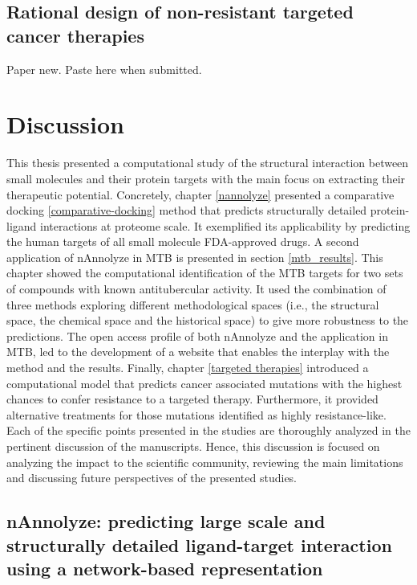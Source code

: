 \documentclass[11pt, b5paper,twoside]{tesi_upf}
\begin{document}
\clearpage
\subsection{Rational design of non-resistant targeted cancer therapies}\label{blending}

\par Paper new. Paste here when submitted. 



\clearpage
\section{Discussion}\label{discussion}

\par This thesis presented a computational study of the structural interaction between small molecules and their protein targets with the main focus on extracting their therapeutic potential. Concretely, chapter \ref{nannolyze} presented a comparative docking \ref{comparative-docking} method that predicts structurally detailed protein-ligand interactions at proteome scale. It exemplified its applicability by predicting the human targets of all small molecule FDA-approved drugs. A second application of nAnnolyze in MTB is presented in section \ref{mtb_results}. This chapter showed the computational identification of the MTB targets for two sets of compounds with known antitubercular activity. It used the combination of three methods exploring different methodological spaces (i.e., the structural space, the chemical space and the historical space) to give more robustness to the predictions. The open access profile of both nAnnolyze and the application in MTB, led to the development of a website that enables the interplay with the method and the results. Finally, chapter \ref{targeted therapies} introduced a computational model that predicts cancer associated mutations with the highest chances to confer resistance to a targeted therapy. Furthermore, it provided alternative treatments for those mutations identified as highly resistance-like. Each of the specific points presented in the studies are thoroughly analyzed in the pertinent discussion of the manuscripts. Hence, this discussion is focused on analyzing the impact to the scientific community, reviewing the main limitations and discussing future perspectives of the presented studies.

 \subsection{nAnnolyze: predicting large scale and structurally detailed ligand-target interaction using a network-based representation}
 
\end{document}

